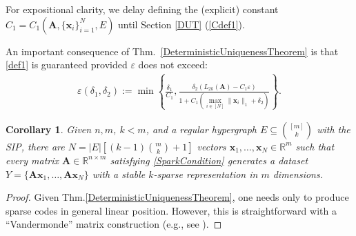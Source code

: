 \documentclass[9pt,twocolumn]{pnas-new}
\newtheorem{corollary}{Corollary}
\begin{document}
For expositional clarity, we delay defining the (explicit) constant $C_1 = C_1(\mathbf{A}, \{\mathbf{x}_i\}_{i=1}^N, E)$ until Section \ref{DUT} (\eqref{Cdef1}).  %

An important consequence of Thm.~\ref{DeterministicUniquenessTheorem} is that \eqref{def1} is guaranteed provided $\varepsilon$ does not exceed: %
\begin{align}\label{epsdel}
\varepsilon(\delta_1, \delta_2) := \min \left\{ \frac{\delta_1}{ C_1 }, \frac{ \delta_2 (L_{2k}(\mathbf{A}) -  C_1\varepsilon)}{ 1 + C_1 \left( \max_{i \in [N]} \|\mathbf{x}_i\|_1  + \delta_2 \right) } \right\}.
\end{align}


\begin{corollary}\label{DeterministicUniquenessCorollary}
Given $n, m$, $k < m$, and a regular hypergraph $E \subseteq {[m] \choose k}$ with the SIP, there are $N =  |E| \left[ (k-1){m \choose k} + 1  \right]$ vectors \mbox{$\mathbf{x}_1, \ldots, \mathbf{x}_N \in \mathbb{R}^m$} such that every matrix $\mathbf{A} \in \mathbb{R}^{n \times m}$ satisfying \eqref{SparkCondition} generates a dataset $Y = \{\mathbf{A}\mathbf{x}_1, \ldots, \mathbf{A}\mathbf{x}_N\}$ with a stable $k$-sparse representation in $m$ dimensions.
\end{corollary}
\begin{proof}
Given Thm.\ref{DeterministicUniquenessTheorem}, one needs only to produce sparse codes in general linear position.  However, this is straightforward with a ``Vandermonde'' matrix construction (e.g., see \cite{Hillar15}).
\end{proof}
\end{document}
